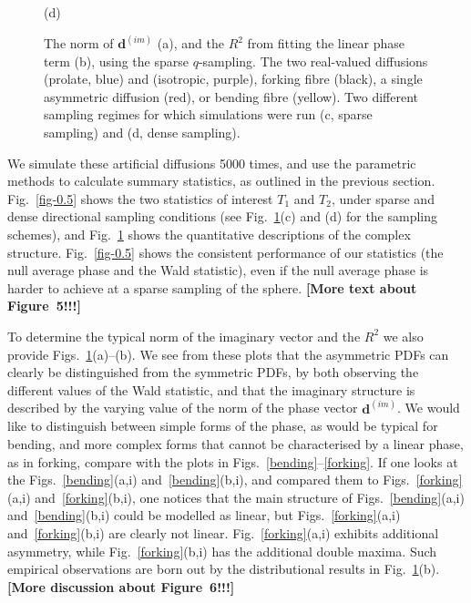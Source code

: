 \documentclass[authoryear,preprint,12pt]{elsarticle}
\newcommand{\bd}{\mathbf{d}}
\newcommand{\q}{\mathbf{q}}
\begin{document}
\begin{figure}[!htbp]
\begin{center}
\begin{minipage}[]{0.42\textwidth}
      (d)
    \end{minipage}
  \end{center}
  \caption{The norm of $\bd^{(im)}$ (a), and the $R^2$ from fitting
    the linear phase term (b), using the sparse $q$-sampling.  The two
    real-valued diffusions (prolate, blue) and (isotropic, purple),
    forking fibre (black), a single asymmetric diffusion (red), or
    bending fibre (yellow).  Two different sampling regimes for which
    simulations were run (c, sparse sampling) and (d, dense
    sampling).}
  \label{fig-1} 
\end{figure}

We simulate these artificial diffusions 5000 times, and use the
parametric methods to calculate summary statistics, as outlined in the
previous section.  Fig.~\ref{fig-0.5} shows the two statistics of
interest $T_1$ and $T_2$, under sparse and dense directional sampling
conditions (see Fig.~\ref{fig-1}(c) and (d) for the sampling schemes),
and Fig.~\ref{fig-1} shows the quantitative descriptions of the
complex structure.  Fig.~\ref{fig-0.5} shows the consistent
performance of our statistics (the null average phase and the Wald
statistic), even if the null average phase is harder to achieve at a
sparse sampling of the sphere.  \textbf{[More text about Figure~5!!!]}

To determine the typical norm of the imaginary vector and the $R^2$ we
also provide Figs.~\ref{fig-1}(a)--(b).  We see from these plots that
the asymmetric PDFs can clearly be distinguished from the symmetric
PDFs, by both observing the different values of the Wald statistic,
and that the imaginary structure is described by the varying value of
the norm of the phase vector $\bd^{(im)}$.  We would like to
distinguish between simple forms of the phase, as would be typical for
bending, and more complex forms that cannot be characterised by a
linear phase, as in forking, compare with the plots in
Figs.~\ref{bending}--\ref{forking}.  If one looks at the
Figs.~\ref{bending}(a,i) and~\ref{bending}(b,i), and compared them to
Figs.~\ref{forking}(a,i) and~\ref{forking}(b,i), one notices that the
main structure of Figs.~\ref{bending}(a,i) and~\ref{bending}(b,i)
could be modelled as linear, but Figs.~\ref{forking}(a,i)
and~\ref{forking}(b,i) are clearly not linear.
Fig.~\ref{forking}(a,i) exhibits additional asymmetry, while
Fig.~\ref{forking}(b,i) has the additional double maxima.  Such
empirical observations are born out by the distributional results in
Fig.~\ref{fig-1}(b).  \textbf{[More discussion about Figure~6!!!]}
\end{document}
